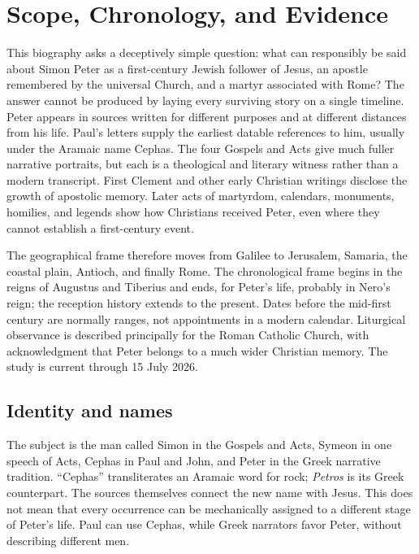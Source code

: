 \section{Scope, Chronology, and Evidence}\label{sec:peter-method}

This biography asks a deceptively simple question: what can responsibly be
said about Simon Peter as a first-century Jewish follower of Jesus, an apostle
remembered by the universal Church, and a martyr associated with Rome? The
answer cannot be produced by laying every surviving story on a single
timeline. Peter appears in sources written for different purposes and at
different distances from his life. Paul's letters supply the earliest datable
references to him, usually under the Aramaic name Cephas. The four Gospels and
Acts give much fuller narrative portraits, but each is a theological and
literary witness rather than a modern transcript. First Clement and other
early Christian writings disclose the growth of apostolic memory. Later acts
of martyrdom, calendars, monuments, homilies, and legends show how Christians
received Peter, even where they cannot establish a first-century event.

The geographical frame therefore moves from Galilee to Jerusalem, Samaria,
the coastal plain, Antioch, and finally Rome. The chronological frame begins
in the reigns of Augustus and Tiberius and ends, for Peter's life, probably in
Nero's reign; the reception history extends to the present. Dates before the
mid-first century are normally ranges, not appointments in a modern calendar.
Liturgical observance is described principally for the Roman Catholic Church,
with acknowledgment that Peter belongs to a much wider Christian memory. The
study is current through 15 July 2026.

\subsection{Identity and names}

The subject is the man called Simon in the Gospels and Acts, Symeon in one
speech of Acts, Cephas in Paul and John, and Peter in the Greek narrative
tradition. ``Cephas'' transliterates an Aramaic word for rock; \emph{Petros} is
its Greek counterpart. The sources themselves connect the new name with
Jesus. This does not mean that every occurrence can be mechanically assigned
to a different stage of Peter's life. Paul can use Cephas, while Greek
narrators favor Peter, without describing different men.

